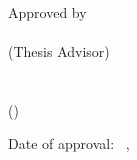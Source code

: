 \clearpage
\thispagestyle{empty}

\begin{center}
    \MakeUppercase{\textbf{\thesistitle}} \\
\end{center}


\vfill
{Approved by} \\
[3\baselineskip]

\advisor \dotfill \\
(Thesis Advisor) \\[\baselineskip]


\domjurya \dotfill \\[2\baselineskip]


\forjury \dotfill \\
(\forjuryuni)
\vfill

Date of approval:  \month~\day,~\year

\clearpage